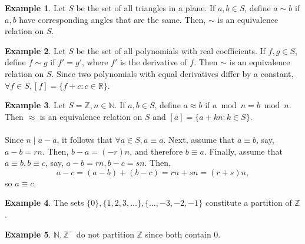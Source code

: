\documentclass{article}
\theoremstyle{definition}
\newtheorem{definition}{Definition}[section]
\newtheorem{example}{Example}[section]
\begin{document}
\noindent{}


\begin{example}
    Let $S$ be the set of all triangles in a plane. If $a,b \in S$, define $a \sim b$ if $a,b$ have corresponding angles that are the same. Then, $\sim$ is an equivalence relation on $S$.
\end{example}

\begin{example}
    Let $S$ be the set of all polynomials with real coefficients. If $f,g \in S$, define $f \sim g$ if $f' = g'$, where $f'$ is the derivative of $f$. Then $\sim$ is an equivalence relation on $S$. Since two polynomials with equal derivatives differ by a constant, $\forall f \in S, [f] = \{f+c:c \in \mathbb{R}\}$.
\end{example}

\begin{example}
    Let $S = \mathbb{Z}, n \in \mathbb{N}$. If $a,b \in S$, define $a \approx b$ if $a \bmod n = b \bmod n$. Then $\approx$ is an equivalence relation on $S$ and $[a] = \{a+kn:k \in S\}$. 
    \\ \\
    Since $n \mid a-a$, it follows that $\forall a \in S, a \equiv a$. Next, assume that $a \equiv b$, say, $a-b = rn$. Then, $b-a = (-r)n$, and therefore $b \equiv a$. Finally, assume that $a \equiv b, b \equiv c$, say, $a-b = rn, b-c = sn$. Then,
    \begin{equation*}
        a-c = (a-b)+(b-c) = rn+sn = (r+s)n,
    \end{equation*}
    so $a \equiv c$.
\end{example}

\noindent{}

\begin{example}
    The sets $\{0\},\{1,2,3,\dots\},\{\dots,-3,-2,-1\}$ constitute a partition of $\mathbb{Z}$.
\end{example}

\begin{example}
    $\mathbb{N}, \mathbb{Z}^-$ do not partition $\mathbb{Z}$ since both contain 0.
\end{example}
\end{document}
